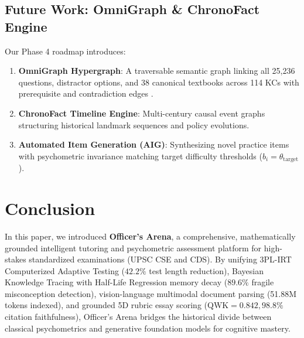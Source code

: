 \documentclass[conference]{IEEEtran}
\begin{document}
\subsection{Future Work: OmniGraph \& ChronoFact Engine}
Our Phase 4 roadmap introduces:
\begin{enumerate}[leftmargin=*]
    \item \textbf{OmniGraph Hypergraph}: A traversable semantic graph linking all 25,236 questions, distractor options, and 38 canonical textbooks across 114 KCs with prerequisite and contradiction edges \cite{Liang2024}.
    \item \textbf{ChronoFact Timeline Engine}: Multi-century causal event graphs structuring historical landmark sequences and policy evolutions.
    \item \textbf{Automated Item Generation (AIG)}: Synthesizing novel practice items with psychometric invariance matching target difficulty thresholds ($b_i = \theta_{\text{target}}$).
\end{enumerate}

\section{Conclusion}
In this paper, we introduced \textbf{Officer's Arena}, a comprehensive, mathematically grounded intelligent tutoring and psychometric assessment platform for high-stakes standardized examinations (UPSC CSE and CDS). By unifying 3PL-IRT Computerized Adaptive Testing ($42.2\%$ test length reduction), Bayesian Knowledge Tracing with Half-Life Regression memory decay ($89.6\%$ fragile misconception detection), vision-language multimodal document parsing (51.88M tokens indexed), and grounded 5D rubric essay scoring ($\text{QWK} = 0.842, 98.8\%$ citation faithfulness), Officer's Arena bridges the historical divide between classical psychometrics and generative foundation models for cognitive mastery.
\end{document}
